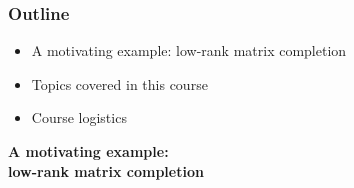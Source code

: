 \documentclass[compress,
mathserif,wide,%
]{beamer}
\begin{document}
\begin{frame}
  \frametitle{Outline}
  \begin{itemize}
    \item A motivating example: low-rank matrix completion
    \item Topics covered in this course
    \item Course logistics
  \end{itemize}
\end{frame}


\begin{frame}[plain]

\vfill
\begin{center}
  {\Large \bf A motivating example: \\
  low-rank matrix completion}
\end{center}
\vfill

\end{frame}
\end{document}
